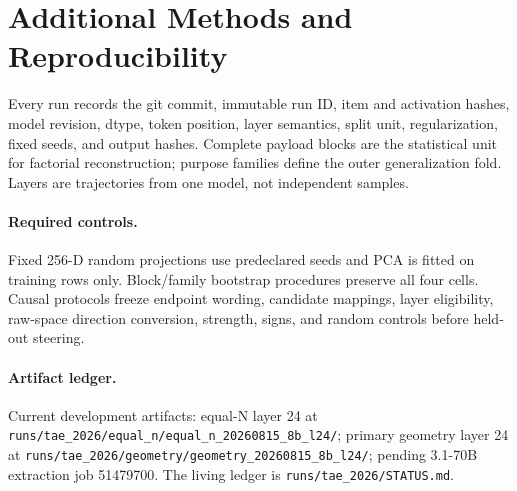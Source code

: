 \section{Additional Methods and Reproducibility}
Every run records the git commit, immutable run ID, item and activation hashes, model revision, dtype, token position, layer semantics, split unit, regularization, fixed seeds, and output hashes. Complete payload blocks are the statistical unit for factorial reconstruction; purpose families define the outer generalization fold. Layers are trajectories from one model, not independent samples.

\paragraph{Required controls.} Fixed 256-D random projections use predeclared seeds and PCA is fitted on training rows only. Block/family bootstrap procedures preserve all four cells. Causal protocols freeze endpoint wording, candidate mappings, layer eligibility, raw-space direction conversion, strength, signs, and random controls before held-out steering.

\paragraph{Artifact ledger.} Current development artifacts: equal-N layer 24 at \texttt{runs/tae\_2026/equal\_n/equal\_n\_20260815\_8b\_l24/}; primary geometry layer 24 at \texttt{runs/tae\_2026/geometry/geometry\_20260815\_8b\_l24/}; pending 3.1-70B extraction job 51479700. The living ledger is \texttt{runs/tae\_2026/STATUS.md}.
